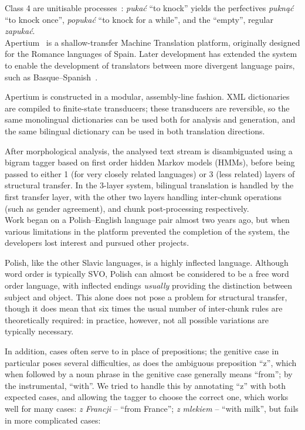 \documentclass[11pt]{article}
\begin{document}
Class 4 are unitisable processes~\citep{aalstein07}: {\it puka\'{c}}
``to knock'' yields the perfectives {\it pukn\k{a}\'{c}} ``to knock once'', 
{\it popuka\'{c}} ``to knock for a while'', and the ``empty'', regular 
{\it zapuka\'{c}}.\\

Apertium~\citep{corbi05oss} is a shallow-transfer Machine Translation platform,
originally designed for the Romance languages of Spain. Later development has
extended the system to enable the development of translators between more
divergent language pairs, such as Basque--Spanish~\citep{ginesti09}.

Apertium is constructed in a modular, assembly-line fashion. XML dictionaries
are compiled to finite-state transducers; these transducers are reversible, so
the same monolingual dictionaries can be used both for analysis and generation,
and the same bilingual dictionary can be used in both translation directions.

After morphological analysis, the analysed text stream is disambiguated using
a bigram tagger based on first order hidden Markov models (HMMs), before
being passed to either 1 (for very closely related languages) or 3 
(less related) layers of structural transfer. In the 3-layer system,
bilingual translation is handled by the first transfer layer, with the
other two layers handling inter-chunk operations (such as gender 
agreement), and chunk post-processing respectively.\\

Work began on a Polish--English language pair almost two years ago,
but when various limitations in the platform prevented the completion of
the system, the developers lost interest and pursued other projects.

Polish, like the other Slavic languages, is a highly
inflected language. Although word order is typically SVO, Polish can almost
be considered to be a free word order language, with inflected endings
{\it usually} providing the distinction between subject and object. This 
alone does not pose a problem for structural transfer, though it does
mean that six times the usual number of inter-chunk rules are theoretically
required: in practice, however, not all possible variations are typically 
necessary. 

In addition, cases often serve to in place of prepositions; the genitive
case in particular poses several difficulties, as does the ambiguous
preposition ``z'', which when followed by a noun phrase in the genitive
case generally means ``from''; by the instrumental, ``with''. We tried
to handle this by annotating ``z'' with both expected cases, and
allowing the tagger to choose the correct one, which works well for
many cases: {\it z Francji} -- ``from France''; {\it z mlekiem} --
``with milk'', but fails in more complicated cases:
\end{document}
